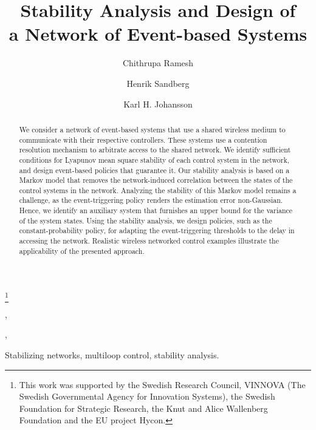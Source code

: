 \documentclass[twocolumn]{autart}
\begin{document}
\begin{frontmatter}
\title{Stability Analysis and Design of \\
a Network of Event-based Systems}
\thanks[footnoteinfo]{This work was supported by the Swedish Research Council, VINNOVA (The Swedish Governmental Agency for Innovation Systems), the Swedish Foundation for Strategic Research, the Knut and Alice Wallenberg Foundation and the EU project Hycon.}
\author{Chithrupa Ramesh},    \author{Henrik Sandberg},  \author{Karl H. Johansson}
\address{ACCESS Linnaeus Centre, KTH Royal Institute of Technology, Electrical Engineering, Stockholm, Sweden}


\begin{keyword}                           Stabilizing networks, multiloop control, stability analysis.              \end{keyword}                             

\begin{abstract}
We consider a network of event-based systems that use a shared wireless medium to communicate with their respective controllers. These systems use a contention resolution mechanism to arbitrate access to the shared network. We identify sufficient conditions for Lyapunov mean square stability of each control system in the network, and design event-based policies that guarantee it. Our stability analysis is based on a Markov model that removes the network-induced correlation between the states of the control systems in the network. Analyzing the stability of this Markov model remains a challenge, as the event-triggering policy renders the estimation error non-Gaussian. Hence, we identify an auxiliary system that furnishes an upper bound for the variance of the system states. Using the stability analysis, we design policies, such as the constant-probability policy, for adapting the event-triggering thresholds to the delay in accessing the network. Realistic wireless networked control examples illustrate the applicability of the presented approach.
\end{abstract}
\end{frontmatter}
\end{document}
